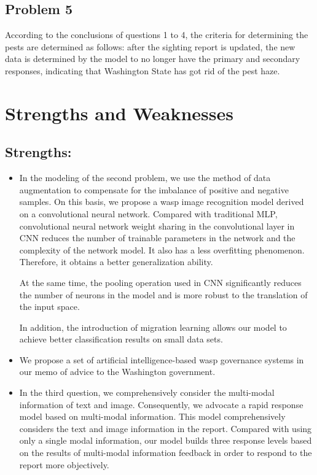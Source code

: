 \documentclass{mcmthesis}
\begin{document}
\hspace*{\fill}
\subsection{Problem 5}
According to the conclusions of questions 1 to 4, the criteria for determining the pests are determined as follows: after the sighting report is updated, the new data is determined by the model to no longer have the primary and secondary responses, indicating that Washington State has got rid of the pest haze.

\section{Strengths and Weaknesses}
\subsection{Strengths:}
\begin{itemize}
	\item In the modeling of the second problem, we use the method of data augmentation to compensate for the imbalance of positive and negative samples. On this basis, we propose a wasp image recognition model derived on a convolutional neural network. Compared with traditional MLP, convolutional neural network weight sharing in the convolutional layer in CNN reduces the number of trainable parameters in the network and the complexity of the network model. It also has a less overfitting phenomenon. Therefore, it obtains a better generalization ability. 
	
	At the same time, the pooling operation used in CNN significantly reduces the number of neurons in the model and is more robust to the translation of the input space. 
	
	In addition, the introduction of migration learning allows our model to achieve better classification results on small data sets.
	
	\item We propose a set of artificial intelligence-based wasp governance systems in our memo of advice to the Washington government.
	\item In the third question, we comprehensively consider the multi-modal information of text and image. Consequently, we advocate a rapid response model based on multi-modal information. This model comprehensively considers the text and image information in the report. Compared with using only a single modal information, our model builds three response levels based on the results of multi-modal information feedback in order to respond to the report more objectively.
	
\end{itemize}
\end{document}
